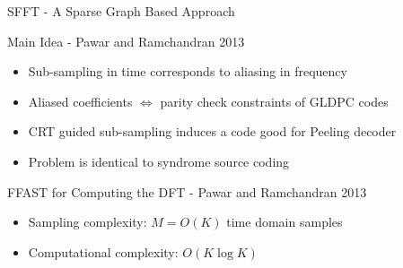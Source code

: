 	\begin{frame}{SFFT - A Sparse Graph Based Approach}
		
		\begin{block}{Main Idea - Pawar and Ramchandran 2013}
			\begin{itemize}
				\item \alert{Sub-sampling} in time corresponds to \alert{aliasing} in frequency
				\item Aliased coefficients $\Leftrightarrow$ parity check constraints of \alert{GLDPC codes}
				\item \alert{CRT} guided sub-sampling induces a code good for \alert{Peeling decoder}
                \item Problem is identical to syndrome source coding
			\end{itemize}
		\end{block}
		
		\pause
		
		\begin{block}{FFAST for Computing the DFT - Pawar and Ramchandran 2013}
			\begin{itemize}
				\item \alert{{Sampling complexity:}} $M = O(K)$ time domain samples
				\item \alert{{Computational complexity:}} $O(K \log{K})$
			\end{itemize}
		\end{block}
		
		
		
	\end{frame}
